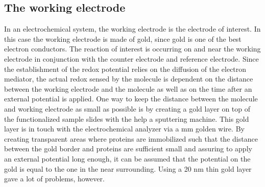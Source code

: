 \documentclass[twoside,single]{lion-msc}
\begin{document}
\subsection{The working electrode}
In an electrochemical system, the working electrode is the electrode of interest. In this case the working electrode is made of gold, since gold is one of the best electron conductors. The reaction of interest is occurring on and near the working electrode in conjunction with the counter electrode and reference electrode. Since the establishment of the redox potential relies on the diffusion of the electron mediator, the actual redox sensed by the molecule is dependent on the distance between the working electrode and the molecule as well as on the time after an external potential is applied. One way to keep the distance between the molecule and working electrode as small as possible is by creating a gold layer on top of the functionalized sample slides with the help a sputtering machine. This gold layer is in touch with the electrochemical analyzer via a  mm golden wire.  By creating transparent areas where proteins are immobilized such that the distance between the gold border and proteins are sufficient small and assuring to apply an external potential long enough, it can be assumed that the potential on the gold is equal to the one in the near surrounding. Using a 20 nm thin gold layer gave a lot of problems, however. 
\end{document}

